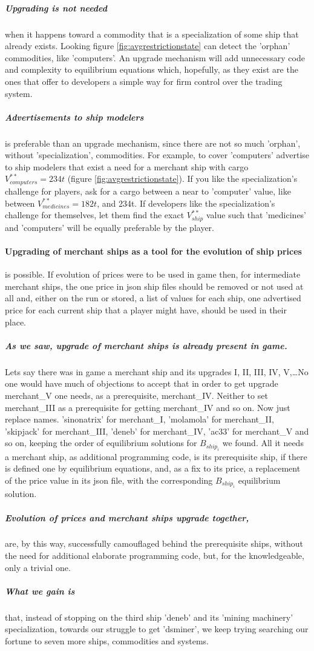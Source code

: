 \documentclass[]{article}
\begin{document}
 \subparagraph{Upgrading is not needed} when it happens toward a commodity that is a specialization of some ship that already exists. Looking figure \ref{fig:avgrestrictionstate} can detect the 'orphan' commodities, like 'computers'. An upgrade mechanism will add unnecessary code and complexity to equilibrium equations which, hopefully, as they exist are the ones that offer to developers a simple way for firm control over the trading system.
 \subparagraph{Advertisements to ship modelers} is preferable than an upgrade mechanism, since there are not so much 'orphan', without 'specialization', commodities. For example, to cover 'computers' advertise to ship modelers that exist a need for a merchant ship with cargo $V^{**}_{computers}=234t$ (figure \ref{fig:avgrestrictionstate}). If you like the specialization's challenge for players, ask for a cargo between a near to 'computer' value, like between $V^{**}_{medicines}=182t$, and 234t. If developers like the specialization's challenge for themselves, let them find the exact $V^{**}_{ship}$ value such that 'medicines' and 'computers' will be equally preferable by the player.
\paragraph{Upgrading of merchant ships as a tool for the evolution of ship prices} is possible. If evolution of prices were to be used in game then,  for intermediate merchant ships, the one price in json ship files should be removed or not used at all and, either on the run or stored, a list of values for each ship,  one advertised price for each current ship that a player might have, should be used in their place. 
\subparagraph*{As we saw, upgrade of merchant ships is already present in game.} Lets say there was in game a merchant ship and its upgrades I, II, III, IV, V,\ldots No one would have much of objections to accept that in order to get upgrade merchant\_V one needs, as a prerequisite, merchant\_IV. Neither to set merchant\_III as a prerequisite for getting merchant\_IV and so on. Now just replace names. 'sinonatrix' for merchant\_I, 
 'molamola' for merchant\_II, 'skipjack' for merchant\_III, 'deneb' for  merchant\_IV, 
'ac33' for merchant\_V and so on, keeping the order of equilibrium solutions for $B_{ship_{i}}$ we found. All it needs a merchant ship, as additional programming code, is its prerequisite ship, if there is defined one by equilibrium equations, and, as a fix to its price, a replacement of the price value in its json file, with the corresponding $B_{ship_{i}}$ equilibrium solution.\label{prerequisiteShips}
\subparagraph{Evolution of prices and merchant ships upgrade together,} are, by this way, successfully camouflaged behind the prerequisite ships, without the need for additional elaborate programming code, but, for the knowledgeable, only a trivial one.
\subparagraph*{What we gain is} that, instead of stopping on the third ship 'deneb' and its 'mining machinery' specialization, towards our struggle to get 'dsminer', we keep trying searching our fortune to seven more ships, commodities and systems.
\end{document}
